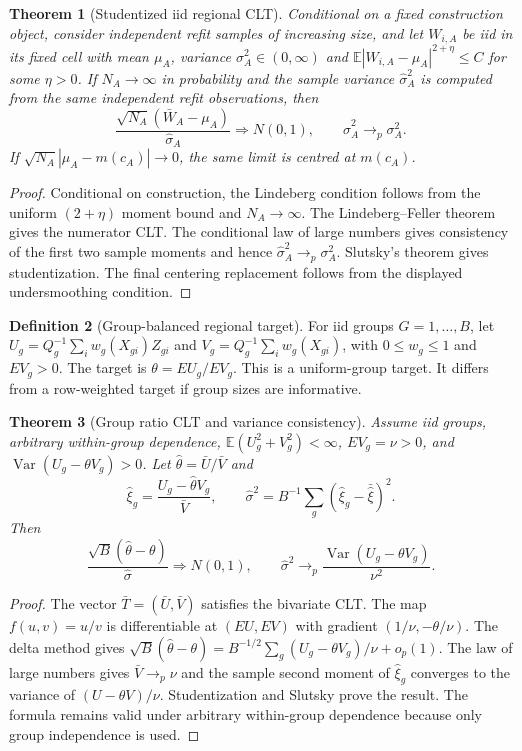 \documentclass[11pt,a4paper]{article}
\newcommand{\E}{\mathbb E}\newcommand{\Pp}{\mathbb P}
\newcommand{\Var}{\operatorname{Var}}
\numberwithin{equation}{section}
\newtheorem{theorem}{Theorem}[section]
\theoremstyle{definition}\newtheorem{definition}[theorem]{Definition}
\theoremstyle{remark}\newtheorem{remark}[theorem]{Remark}
\begin{document}
\begin{theorem}[Studentized iid regional CLT]\label{thm:iidclt}
Conditional on a fixed construction object, consider independent refit samples of increasing size, and let $W_{i,A}$ be iid in its fixed cell with mean $\mu_A$, variance $\sigma_A^2\in(0,\infty)$ and $\E|W_{i,A}-\mu_A|^{2+\eta}\le C$ for some $\eta>0$. If $N_A\to\infty$ in probability and the sample variance $\hat\sigma_A^2$ is computed from the same independent refit observations, then
\[
 \frac{\sqrt{N_A}(\bar W_A-\mu_A)}{\hat\sigma_A}\Rightarrow N(0,1),\qquad
 \hat\sigma_A^2\to_p\sigma_A^2.
\]
If $\sqrt{N_A}|\mu_A-m(c_A)|\to0$, the same limit is centred at $m(c_A)$.
\end{theorem}
\begin{proof}
Conditional on construction, the Lindeberg condition follows from the uniform $(2+\eta)$ moment bound and $N_A\to\infty$. The Lindeberg--Feller theorem gives the numerator CLT. The conditional law of large numbers gives consistency of the first two sample moments and hence $\hat\sigma_A^2\to_p\sigma_A^2$. Slutsky's theorem gives studentization. The final centering replacement follows from the displayed undersmoothing condition.
\end{proof}

\begin{definition}[Group-balanced regional target]\label{def:group}
For iid groups $G=1,\ldots,B$, let $U_g=Q_g^{-1}\sum_iw_g(X_{gi})Z_{gi}$ and
$V_g=Q_g^{-1}\sum_iw_g(X_{gi})$, with $0\le w_g\le1$ and $EV_g>0$. The target is
$\theta=EU_g/EV_g$. This is a uniform-group target. It differs from a row-weighted target if group sizes are informative.
\end{definition}

\begin{theorem}[Group ratio CLT and variance consistency]\label{thm:ratioCLT}
Assume iid groups, arbitrary within-group dependence, $\E(U_g^2+V_g^2)<\infty$, $EV_g=\nu>0$, and
$\Var(U_g-\theta V_g)>0$. Let $\hat\theta=\bar U/\bar V$ and
\[
 \hat\xi_g=\frac{U_g-\hat\theta V_g}{\bar V},\qquad
 \hat\sigma^2=B^{-1}\sum_g(\hat\xi_g-\bar{\hat\xi})^2.
\]
Then
\[
 \frac{\sqrt B(\hat\theta-\theta)}{\hat\sigma}\Rightarrow N(0,1),\qquad
 \hat\sigma^2\to_p\frac{\Var(U_g-\theta V_g)}{\nu^2}.
\]
\end{theorem}
\begin{proof}
The vector $\bar T=(\bar U,\bar V)$ satisfies the bivariate CLT. The map $f(u,v)=u/v$ is differentiable at $(EU,EV)$ with gradient $(1/\nu,-\theta/\nu)$. The delta method gives
$\sqrt B(\hat\theta-\theta)=B^{-1/2}\sum_g(U_g-\theta V_g)/\nu+o_p(1)$.
The law of large numbers gives $\bar V\to_p\nu$ and the sample second moment of $\hat\xi_g$ converges to the variance of $(U-\theta V)/\nu$. Studentization and Slutsky prove the result. The formula remains valid under arbitrary within-group dependence because only group independence is used.
\end{proof}
\end{document}
